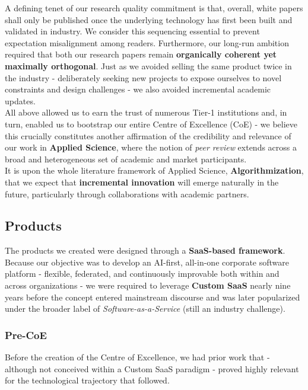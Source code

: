 \documentclass{article}
\begin{document}
A defining tenet of our research quality commitment is that, overall, white papers shall only be published once the underlying technology has first been built and validated in industry. We consider this sequencing essential to prevent expectation misalignment among readers. Furthermore, our long-run ambition required that both our research papers remain \textbf{organically coherent yet maximally orthogonal}. Just as we avoided selling the same product twice in the industry - deliberately seeking new projects to expose ourselves to novel constraints and design challenges - we also avoided incremental academic updates.\\

All above allowed us to earn the trust of numerous Tier-1 institutions and, in turn, enabled us to bootstrap our entire Centre of Excellence (CoE) - we believe this crucially constitutes another affirmation of the credibility and relevance of our work in \textbf{Applied Science}, where the notion of \textit{peer review} extends across a broad and heterogeneous set of academic and market participants.\\

It is upon the whole literature framework of Applied Science, \textbf{Algorithmization}, that we expect that \textbf{incremental innovation} will emerge naturally in the future, particularly through collaborations with academic partners.\\


\subsection{Products}
\label{subsection: Products}

The products we created were designed through a \textbf{SaaS-based framework}. Because our objective was to develop an AI-first, all-in-one corporate software platform - flexible, federated, and continuously improvable both within and across organizations - we were required to leverage \textbf{Custom SaaS} nearly nine years before the concept entered mainstream discourse and was later popularized under the broader label of \textit{Software-as-a-Service} (still an industry challenge).\\


\subsubsection{Pre-CoE}
\label{subsubsection: Pre-CoE}

Before the creation of the Centre of Excellence, we had prior work that - although not conceived within a Custom SaaS paradigm - proved highly relevant for the technological trajectory that followed.\\
\end{document}

